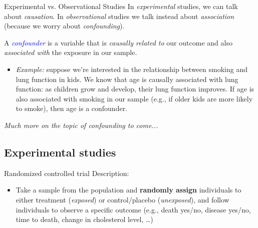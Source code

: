 \documentclass[10pt,t]{beamer}
\begin{document}
	
\begin{frame}{Experimental vs. Observational Studies}
In \textit{experimental} studies, we can talk about \color{blue} \textit{causation}\color{black}. In \textit{observational} studies we  talk instead about \color{blue} \textit{association} \color{black}(because we worry about \color{blue} \textit{confounding}\color{black}). \\

\vspace{0.3cm}

A \textit{\textcolor{blue}{confounder}} is a variable that is \textit{causally related to} our outcome and also \textit{associated with} the exposure in our sample.  \\

\vspace{0.3cm}

\begin{itemize}
	\item[] \textit{Example:} suppose we're interested in the relationship between smoking and lung function in kids. We know that age is causally associated with lung function: as children grow and develop, their lung function improves. If age is also associated with smoking in our sample (e.g., if older kids are more likely to smoke), then age is a confounder.
\end{itemize} 

\vspace{0.3cm}

\small \textit{Much more on the topic of confounding to come...} 
\end{frame}

\subsection{Experimental studies}

\begin{frame}{Randomized controlled trial}
Description:
\begin{itemize}
	\item Take a sample from the population and \textbf{randomly assign} individuals to either treatment (\textit{exposed}) or control/placebo (\textit{unexposed}), and follow individuals to observe a specific outcome (e.g., death yes/no, disease yes/no, time to death, change in cholesterol level, \dots)
\end{itemize}
\end{frame}
\end{document}
